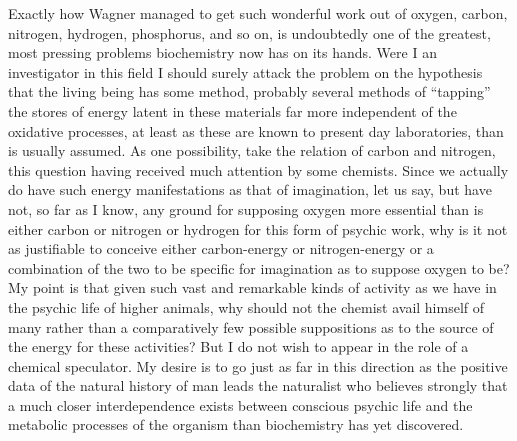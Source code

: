 \documentclass[a4paper, 11pt, oneside, polutonikogreek, english, landscape]{article}
\begin{document}
Exactly how Wagner managed to get such wonderful work out of oxygen, carbon, nitrogen, hydrogen, phosphorus, and so on, is undoubtedly one of the greatest, most pressing problems biochemistry now has on its hands. Were I an investigator in this field I should surely attack the problem on the hypothesis that the living being has some method, probably several methods of ``tapping'' the stores of energy latent in these materials far more independent of the oxidative processes, at least as these are known to present day laboratories, than is usually assumed. As one possibility, take the relation of carbon and nitrogen, this question having received much attention by some chemists. Since we actually do have such energy manifestations as that of imagination, let us say, but have not, so far as I know, any ground for supposing oxygen more essential than is either carbon or nitrogen or hydrogen for this form of psychic work, why is it not as justifiable to conceive either carbon-energy or nitrogen-energy or a combination of the two to be specific for imagination as to suppose oxygen to be? My point is that given such vast and remarkable kinds of activity as we have in the psychic life of higher animals, why should not the chemist avail himself of many rather than a comparatively few possible suppositions as to the source of the energy for these activities? But I do not wish to appear in the role of a chemical speculator. My desire is to go just as far in this direction as the positive data of the natural history of man leads the naturalist who believes strongly that a much closer interdependence exists between conscious psychic life and the metabolic processes of the organism than biochemistry has yet discovered.

\subsection{}
\end{document}
